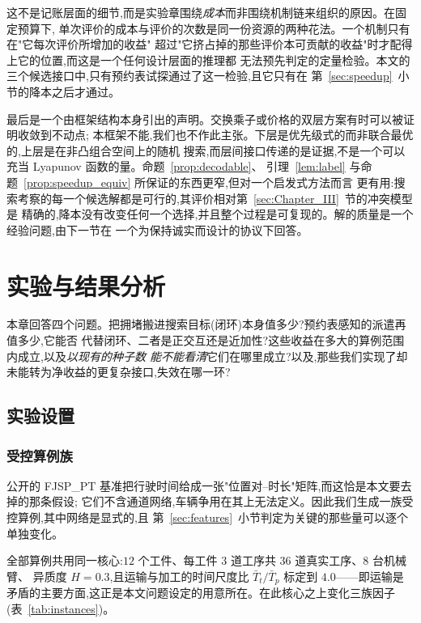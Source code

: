 \documentclass[manuscript,screen,review]{acmart}
\begin{document}
这不是记账层面的细节,而是实验章围绕\emph{成本}而非围绕机制链来组织的原因。在固定预算下,
单次评价的成本与评价的次数是同一份资源的两种花法。一个机制只有在"它每次评价所增加的收益"
超过"它挤占掉的那些评价本可贡献的收益"时才配得上它的位置,而这是一个任何设计层面的推理都
无法预先判定的定量检验。本文的三个候选接口中,只有预约表试探通过了这一检验,且它只有在
第~\ref{sec:speedup}~小节的降本之后才通过。

最后是一个由框架结构本身引出的声明。交换乘子或价格的双层方案有时可以被证明收敛到不动点;
本框架不能,我们也不作此主张。下层是优先级式的而非联合最优的,上层是在非凸组合空间上的随机
搜索,而层间接口传递的是证据,不是一个可以充当 Lyapunov 函数的量。命题~\ref{prop:decodable}、
引理~\ref{lem:label} 与命题~\ref{prop:speedup_equiv} 所保证的东西更窄,但对一个启发式方法而言
更有用:搜索考察的每一个候选解都是可行的,其评价相对第~\ref{sec:Chapter_III}~节的冲突模型是
精确的,降本没有改变任何一个选择,并且整个过程是可复现的。解的质量是一个经验问题,由下一节在
一个为保持诚实而设计的协议下回答。

\section{实验与结果分析}
\label{sec:Chapter_V}

本章回答四个问题。把拥堵搬进搜索目标(闭环)本身值多少?预约表感知的派遣再值多少,它能否
代替闭环、二者是正交互还是近加性?这些收益在多大的算例范围内成立,以及\emph{以现有的种子数
能不能看清}它们在哪里成立?以及,那些我们实现了却未能转为净收益的更复杂接口,失效在哪一环?

\subsection{实验设置}
\label{sec:instances}

\subsubsection{受控算例族}
公开的 FJSP\_PT 基准把行驶时间给成一张"位置对--时长"矩阵,而这恰是本文要去掉的那条假设;
它们不含通道网络,车辆争用在其上无法定义。因此我们生成一族受控算例,其中网络是显式的,且
第~\ref{sec:features}~小节判定为关键的那些量可以逐个单独变化。

全部算例共用同一核心:$12$ 个工件、每工件 $3$ 道工序共 $36$ 道真实工序、$8$ 台机械臂、
异质度 $H=0.3$,且运输与加工的时间尺度比 $\bar{T}_t/\bar{T}_p$ 标定到 $4.0$——即运输是
矛盾的主要方面,这正是本文问题设定的用意所在。在此核心之上变化三族因子
(表~\ref{tab:instances})。
\end{document}
